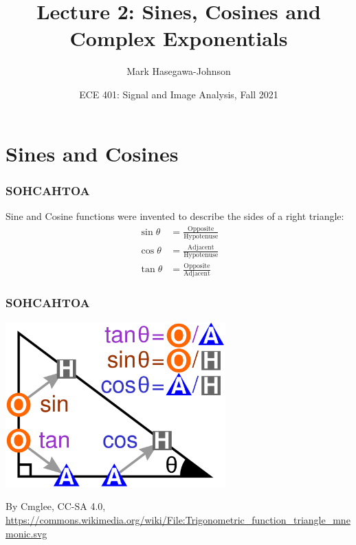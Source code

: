 \documentclass{beamer}
\title{Lecture 2: Sines, Cosines and Complex Exponentials}
\author{Mark Hasegawa-Johnson}
\date{ECE 401: Signal and Image Analysis, Fall 2021}
\begin{document}
\begin{frame}
  \maketitle
\end{frame}

\begin{frame}
  \tableofcontents
\end{frame}

\section[Cosines]{Sines and Cosines}
\setcounter{subsection}{1}

\begin{frame}
  \frametitle{SOHCAHTOA}

  Sine and Cosine functions were invented to describe the sides of a right triangle:
  \begin{align*}
    \sin\theta &= \frac{\mbox{Opposite}}{\mbox{Hypotenuse}}\\
    \cos\theta &= \frac{\mbox{Adjacent}}{\mbox{Hypotenuse}}\\
    \tan\theta &= \frac{\mbox{Opposite}}{\mbox{Adjacent}}
  \end{align*}
\end{frame}

\begin{frame}
  \frametitle{SOHCAHTOA}

  \centerline{\includegraphics[height=2.5in]{sohcahtoa.png}}
  \begin{tiny}
    By Cmglee, CC-SA 4.0,
    \url{https://commons.wikimedia.org/wiki/File:Trigonometric_function_triangle_mnemonic.svg}
  \end{tiny}
\end{frame}
\end{document}
